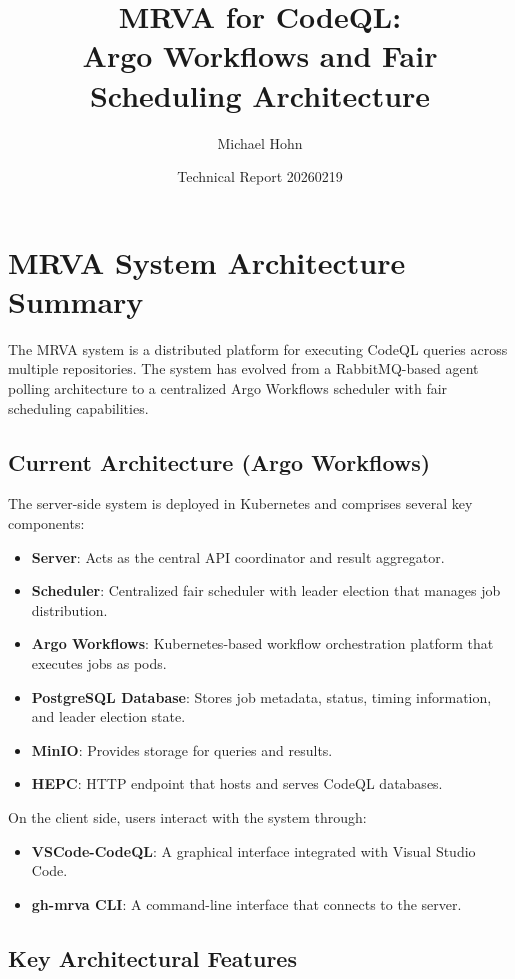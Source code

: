 \documentclass[11pt]{article}
\title{MRVA for CodeQL:\\Argo Workflows and Fair Scheduling Architecture}
\author{Michael Hohn}
\date{Technical Report 20260219}
\begin{document}
\maketitle
\tableofcontents

\section{MRVA System Architecture Summary}

The MRVA system is a distributed platform for executing CodeQL queries across multiple repositories. The system has evolved from a RabbitMQ-based agent polling architecture to a centralized Argo Workflows scheduler with fair scheduling capabilities.

\subsection{Current Architecture (Argo Workflows)}

The server-side system is deployed in Kubernetes and comprises several key components:

\begin{itemize}
\item \textbf{Server}: Acts as the central API coordinator and result aggregator.
\item \textbf{Scheduler}: Centralized fair scheduler with leader election that manages job distribution.
\item \textbf{Argo Workflows}: Kubernetes-based workflow orchestration platform that executes jobs as pods.
\item \textbf{PostgreSQL Database}: Stores job metadata, status, timing information, and leader election state.
\item \textbf{MinIO}: Provides storage for queries and results.
\item \textbf{HEPC}: HTTP endpoint that hosts and serves CodeQL databases.
\end{itemize}

On the client side, users interact with the system through:
\begin{itemize}
\item \textbf{VSCode-CodeQL}: A graphical interface integrated with Visual Studio Code.
\item \textbf{gh-mrva CLI}: A command-line interface that connects to the server.
\end{itemize}

\subsection{Key Architectural Features}
\end{document}
